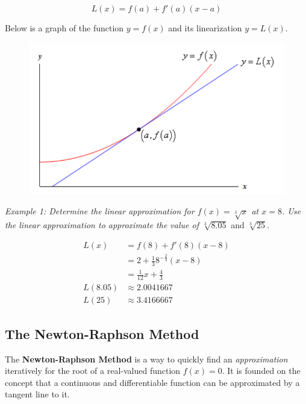 \documentclass{article}
\begin{document}
        \begin{equation*}
            L(x) = f(a) + f'(a)(x-a)
        \end{equation*}

        \noindent Below is a graph of the function $y=f(x)$ and its linearization $y=L(x)$.

        \begin{figure}[hbt!]
            \centering
            \includegraphics[scale=0.6]{Resources/Unit3DiffferentiationApps/Linearization}
        \end{figure}

        \pagebreak

        \noindent \color{blue} \textit{Example 1: Determine the linear approximation for
        $f(x)=\sqrt[3]{x}$ at $x=8$. Use the linear approximation to approximate the value of
        $\sqrt[3]{8.05}$} and $\sqrt[3]{25}$. \color{black}

        \begin{align*}
            L(x)        &= f(8) + f'(8)(x-8) \\
                        &= 2 + \frac{1}{3}8^{-\frac{2}{3}}(x-8) \\
                        &= \frac{1}{12}x + \frac{4}{3} \\
            L(8.05)     &\approx 2.0041667 \\
            L(25)       &\approx 3.4166667
        \end{align*}


    \subsection{The Newton-Raphson Method}
        The \textbf{Newton-Raphson Method} is a way to quickly find an \textit{approximation}
        iteratively for the root of a real-valued function $f(x)=0$. It is founded on the concept
        that a continuous and differentiable function can be approximated by a tangent line to it. \\
\end{document}
